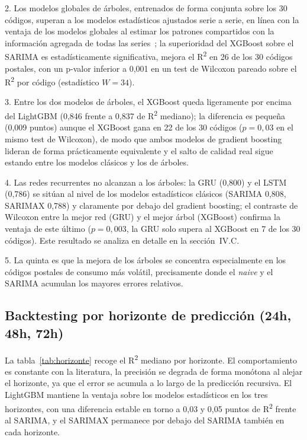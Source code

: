 \documentclass[12pt, a4paper]{article}
\begin{document}
2. Los modelos globales de árboles, entrenados de forma conjunta sobre los 30 códigos, superan a los modelos estadísticos ajustados serie a serie, en línea con la ventaja de los modelos globales al estimar los patrones compartidos con la información agregada de todas las series~\cite{montero2021}; la superioridad del XGBoost sobre el SARIMA es estadísticamente significativa, mejora el R\textsuperscript{2} en 26 de los 30 códigos postales, con un p-valor inferior a 0,001 en un test de Wilcoxon pareado sobre el R\textsuperscript{2} por código (estadístico $W=34$). 

3. Entre los dos modelos de árboles, el XGBoost queda ligeramente por encima del LightGBM (0,846 frente a 0,837 de R\textsuperscript{2} mediano); la diferencia es pequeña (0,009 puntos) aunque el XGBoost gana en 22 de los 30 códigos ($p=0{,}03$ en el mismo test de Wilcoxon), de modo que ambos modelos de gradient boosting lideran de forma prácticamente equivalente y el salto de calidad real sigue estando entre los modelos clásicos y los de árboles. 

4. Las redes recurrentes no alcanzan a los árboles: la GRU (0,800) y el LSTM (0,786) se sitúan al nivel de los modelos estadísticos clásicos (SARIMA 0,808, SARIMAX 0,788) y claramente por debajo del gradient boosting; el contraste de Wilcoxon entre la mejor red (GRU) y el mejor árbol (XGBoost) confirma la ventaja de este último ($p=0{,}003$, la GRU solo supera al XGBoost en 7 de los 30 códigos). Este resultado se analiza en detalle en la sección~IV.C. 

5. La quinta es que la mejora de los árboles se concentra especialmente en los códigos postales de consumo más volátil, precisamente donde el \textit{naive} y el SARIMA acumulan los mayores errores relativos.

\subsection{Backtesting por horizonte de predicción (24h, 48h, 72h)}

La tabla~\ref{tab:horizonte} recoge el R\textsuperscript{2} mediano por horizonte. El comportamiento es constante con la literatura, la precisión se degrada de forma monótona al alejar el horizonte, ya que el error se acumula a lo largo de la predicción recursiva. El LightGBM mantiene la ventaja sobre los modelos estadísticos en los tres horizontes, con una diferencia estable en torno a 0,03 y 0,05 puntos de R\textsuperscript{2} frente al SARIMA, y el SARIMAX permanece por debajo del SARIMA también en cada horizonte.
\end{document}
